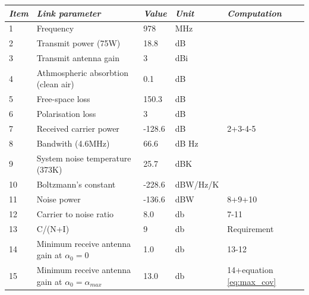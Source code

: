 \begin{center}
 \label{tab:978}
  \begin{tabular}{ l  l  l  l  l}
    \hline
   \textit{Item} & \textit{Link parameter} & \textit{Value} & \textit{Unit} & \textit{Computation} \\ \hline
    1 & Frequency	& 978 & MHz & \\ \hline
    2 & Transmit power (75W) & 18.8 & dB & \\ \hline
    3 & Transmit antenna gain & 3 & dBi & \\ \hline
    4 & Athmospheric absorbtion (clean air) & 0.1 & dB & \\ \hline
    5 & Free-space loss & 150.3 & dB & \\ \hline
    6 & Polarisation loss & 3 & dB & \\ \hline
    7 & Received carrier power & -128.6 & dB & 2+3-4-5\\ \hline
    8 & Bandwith (4.6MHz) & 66.6 & dB Hz & \\ \hline 
    9 & System noise temperature (373K) & 25.7 & dBK& \\ \hline 
    10 & Boltzmann's constant & -228.6 & dBW/Hz/K& \\ \hline 
    11 & Noise power & -136.6 & dBW& 8+9+10\\ \hline 
    12 & Carrier to noise ratio & 8.0 & db & 7-11\\ \hline 
    13 & C/(N+I) & 9 & db & Requirement\\ \hline
    14 & Minimum receive antenna gain at $\alpha_0 = 0 $ & 1.0 & db & 13-12\\ \hline
    15 & Minimum receive antenna gain at $\alpha_0 = \alpha_{max} $ & 13.0 & db & 14+equation \ref{eq:max_cov} \\ \hline
  \end{tabular}
\end{center}

